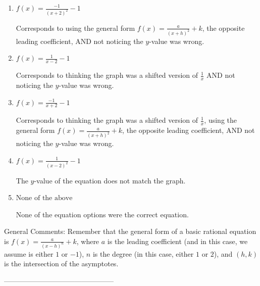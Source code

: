 \documentclass{article}[14pt]
\begin{document}
\begin{enumerate}[label=\Alph*.] 
\item $ f(x) = \frac{-1}{(x + 2)^2} - 1 $ 

 Corresponds to using the general form $f(x) = \frac{a}{(x+h)^2}+k$, the opposite leading coefficient, AND not noticing the $y$-value was wrong. 
\item $ f(x) = \frac{1}{x - 2} - 1 $ 

 Corresponds to thinking the graph was a shifted version of $\frac{1}{x}$ AND not noticing the $y$-value was wrong. 
\item $ f(x) = \frac{-1}{x + 2} - 1 $ 

 Corresponds to thinking the graph was a shifted version of $\frac{1}{x}$, using the general form $f(x) = \frac{a}{(x+h)^2}+k$, the opposite leading coefficient, AND not noticing the $y$-value was wrong. 
\item $ f(x) = \frac{1}{(x - 2)^2} - 1 $ 

 The $y$-value of the equation does not match the graph. 
\item $ \text{None of the above} $ 

 None of the equation options were the correct equation. 
\end{enumerate} 
 
General Comments: Remember that the general form of a basic rational equation is $ f(x) = \frac{a}{(x-h)^n} + k$, where $a$ is the leading coefficient (and in this case, we assume is either $1$ or $-1$), $n$ is the degree (in this case, either $1$ or $2$), and $(h, k)$ is the intersection of the asymptotes.

-----------------------------------------------
\end{document}
